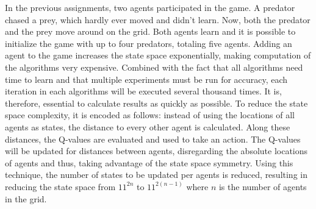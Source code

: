 In the previous assignments, two agents participated in the game. A predator chased a prey, which hardly ever moved and didn't learn. Now, both the predator and the prey move around on the grid. Both agents learn and it is possible to initialize the game with up to four predators, totaling five agents. Adding an agent to the game increases the state space exponentially, making computation of the algorithms very expensive. Combined with the fact that all algorithms need time to learn and that multiple experiments must be run for accuracy, each iteration in each algorithms will be executed several thousand times. It is, therefore, essential to calculate results as quickly as possible. To reduce the state space complexity, it is encoded as follows:  instead of using the locations of all agents as states, the distance to every other agent is calculated. Along these distances, the Q-values are evaluated and used to take an action. The Q-values will be updated for distances between agents, disregarding the absolute locations of agents and thus, taking advantage of the state space symmetry. Using this technique, the number of states to be updated per agents is reduced, resulting in reducing the state space from $11^{2n}$ to $11^{2(n-1)}$ where $n$ is the number of agents in the grid.